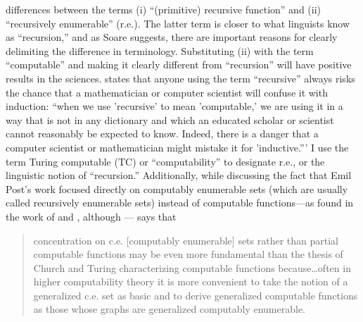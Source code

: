 \documentclass[11pt,twoside]{article}
\theoremstyle{plain}
\numberwithin{equation}{section}
\theoremstyle{definition}
\newtheorem{phrase string}{Phrase String}
\begin{document}
differences between the terms (i) ``(primitive) recursive function'' and (ii) ``recursively enumerable'' (r.e.). The latter term is closer to what linguists know as ``recursion,'' and as Soare suggests, there are important reasons for clearly delimiting  the difference in terminology. Substituting (ii) with the term ``computable'' and making it clearly different from ``recursion'' will have positive results in the sciences. \cite[34]{soare:1996} states that anyone using the term ``recursive'' always risks the chance that a mathematician or computer scientist will confuse it with induction: ``when we use 'recursive' to mean 'computable,' we are using it in a way that is not in any dictionary and which an educated scholar or scientist cannot reasonably be expected to know. Indeed, there is a danger that a computer scientist or mathematician might mistake it for 'inductive.''' I use the term Turing computable (TC) or ``computability'' to designate r.e., or the linguistic notion of ``recursion.'' Additionally, while discussing the fact that Emil Post's work focused directly on computably enumerable sets (which are usually called recursively enumerable sets) instead of computable functions---as found in the work of \cite{church:1936} and \cite{turing:1936}, although \cite{post:1936}---\cite[25]{soare:2008} says that
   
\begin{quotation}
concentration on c.e. [computably enumerable] sets rather than partial computable 	functions may be even more fundamental than the thesis of Church and Turing 	characterizing computable functions because\ldots often in higher computability theory it is more convenient to take the notion of a 	generalized c.e. set as basic and to derive generalized computable functions as 	those whose graphs are generalized computably enumerable.
\end{quotation} 
\end{document}

